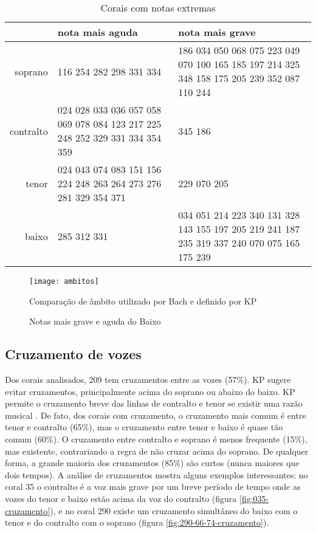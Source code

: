 \begin{table}
\begin{center}
\begin{small}
\begin{sc}
  \begin{tabular}{r|p{4cm}p{4cm}}
    & nota mais aguda & nota mais grave \\ 
    \hline
    soprano &  116 254 282 298 331 334 &  186 034 050 068 075 223 049 070 100 165 185 197 214 325 348 158 175
    205 239 352 087 110 244 \\ \aroundspace
    contralto & 024 028 033 036 057 058 069 078 084 123 217 225 248 252 329 331 334
    354 359 &   345 186 \\ \aroundspace
    tenor &   024 043 074 083 151 156 224 248 263 264 273 276 281 329
    354 371 &   229 070 205 \\ \aroundspace
    baixo &   285 312 331 &   034 051 214 223 340 131 328 143 155 197 205 219 241 187 235 319 337
    240 070 075 165 175 239 
  \end{tabular}
  \caption{Corais com notas extremas}
  \label{tab:notas-extremas}
\end{sc}
\end{small}
\end{center}
\end{table}

\begin{figure}
  \centering
  \texttt{[image: ambitos]}
  \caption{Comparação de âmbito utilizado por Bach e definido por KP}
  \label{fig:ambito-kostka}
\end{figure}

\begin{figure}
  \centering
  \caption{Notas mais grave e aguda do Baixo}
  \label{fig:ambitos-alem}
\end{figure}

\subsection{Cruzamento de vozes}
\label{sec:cruzamento-de-vozes}

Dos corais analisados, 209 tem cruzamentos entre as vozes (57\%). KP
sugere evitar cruzamentos, principalmente acima do soprano ou abaixo
do baixo. KP permite o cruzamento breve das linhas de contralto e
tenor se existir uma razão musical \cite[p. 79]{kostka.ea00:tonal}. De
fato, dos corais com cruzamento, o cruzamento mais comum é entre tenor
e contralto (65\%), mas o cruzamento entre tenor e baixo é quase tão
comum (60\%). O cruzamento entre contralto e soprano é menos frequente
(15\%), mas existente, contrariando a regra de não cruzar acima do
soprano. De qualquer forma, a grande maioria dos cruzamentos (85\%)
são curtos (nunca maiores que dois tempos). A análise de cruzamentos
mostra alguns exemplos interessantes: no coral 35 o contralto é a voz
mais grave por um breve período de tempo onde as vozes do tenor e
baixo estão acima da voz do contralto (figura
\ref{fig:035-cruzamento}), e no coral 290 existe um cruzamento
simultâneo do baixo com o tenor e do contralto com o soprano (figura
\ref{fig:290-66-74-cruzamento}).

